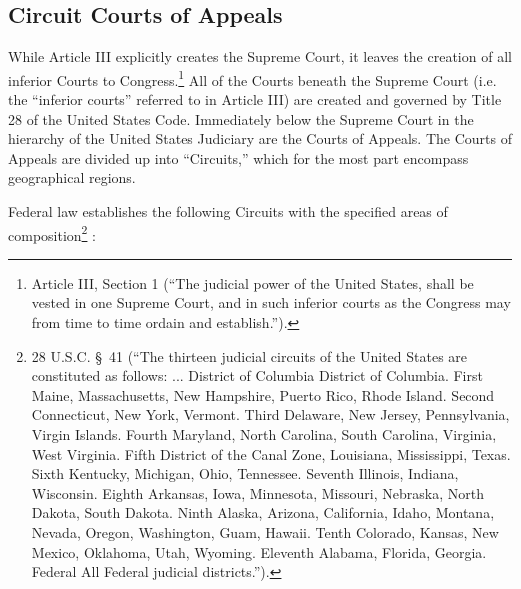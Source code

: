 \subsection{Circuit Courts of Appeals}
While Article III explicitly creates the Supreme Court, it leaves the creation of all inferior Courts to Congress.\footnote{Article III, Section 1 (``The judicial power of the United States, shall be vested in one Supreme Court, and in such inferior courts as the Congress may from time to time ordain and establish.'').}
All of the Courts beneath the Supreme Court (i.e. the ``inferior courts'' referred to in Article III) are created and governed by Title 28 of the United States Code.  Immediately below the Supreme Court in the hierarchy of the United States Judiciary are the Courts of Appeals.  The Courts of Appeals are divided up into ``Circuits,'' which for the most part encompass geographical regions.  

Federal law establishes the following Circuits with the specified areas of composition\footnote{28 U.S.C. \S\ 41 (``The thirteen judicial circuits of the United States are constituted as follows: ... District of Columbia	District of Columbia. First	Maine, Massachusetts, New Hampshire, Puerto Rico, Rhode Island. Second	Connecticut, New York, Vermont. Third	Delaware, New Jersey, Pennsylvania, Virgin Islands. Fourth	Maryland, North Carolina, South Carolina, Virginia, West Virginia. Fifth	District of the Canal Zone, Louisiana, Mississippi, Texas. Sixth	Kentucky, Michigan, Ohio, Tennessee.
Seventh	Illinois, Indiana, Wisconsin. Eighth	Arkansas, Iowa, Minnesota, Missouri, Nebraska, North Dakota, South Dakota. Ninth	Alaska, Arizona, California, Idaho, Montana, Nevada, Oregon, Washington, Guam, Hawaii. Tenth	Colorado, Kansas, New Mexico, Oklahoma, Utah, Wyoming. Eleventh	Alabama, Florida, Georgia. Federal	All Federal judicial districts.'').} :


